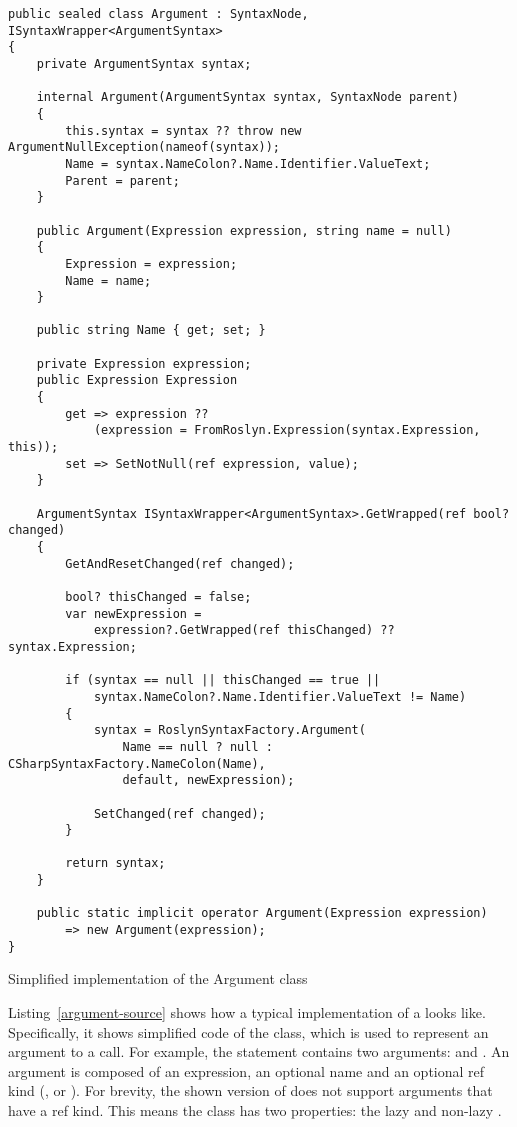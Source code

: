 \begin{listing}
\begin{verbatim}
public sealed class Argument : SyntaxNode, ISyntaxWrapper<ArgumentSyntax>
{
    private ArgumentSyntax syntax;

    internal Argument(ArgumentSyntax syntax, SyntaxNode parent)
    {
        this.syntax = syntax ?? throw new ArgumentNullException(nameof(syntax));
        Name = syntax.NameColon?.Name.Identifier.ValueText;
        Parent = parent;
    }

    public Argument(Expression expression, string name = null)
    {
        Expression = expression;
        Name = name;
    }

    public string Name { get; set; }

    private Expression expression;
    public Expression Expression
    {
        get => expression ??
            (expression = FromRoslyn.Expression(syntax.Expression, this));
        set => SetNotNull(ref expression, value);
    }

    ArgumentSyntax ISyntaxWrapper<ArgumentSyntax>.GetWrapped(ref bool? changed)
    {
        GetAndResetChanged(ref changed);
        
        bool? thisChanged = false;
        var newExpression =
            expression?.GetWrapped(ref thisChanged) ?? syntax.Expression;

        if (syntax == null || thisChanged == true ||
            syntax.NameColon?.Name.Identifier.ValueText != Name)
        {
            syntax = RoslynSyntaxFactory.Argument(
                Name == null ? null : CSharpSyntaxFactory.NameColon(Name),
                default, newExpression);

            SetChanged(ref changed);
        }

        return syntax;
    }

    public static implicit operator Argument(Expression expression)
        => new Argument(expression);
}
\end{verbatim}
\caption{Simplified implementation of the Argument class}
\label{argument-source}
\end{listing}

Listing~\ref{argument-source} shows how a typical implementation of a  looks like. Specifically, it shows simplified code of the  class, which is used to represent an argument to a call. For example, the statement  contains two arguments:  and . An argument is composed of an expression, an optional name and an optional ref kind (,  or ). For brevity, the shown version of  does not support arguments that have a ref kind. This means the class has two properties: the lazy  and non-lazy .

